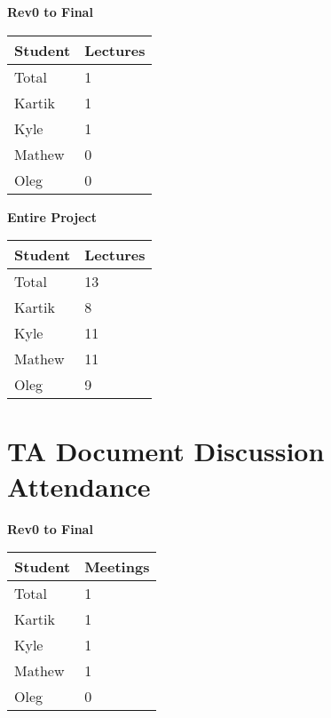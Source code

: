 \documentclass{article}
\begin{document}



\begin{table}[H]
    \centering
    \textbf{Rev0 to Final}\\
    \begin{tabular}{ll}
    \toprule
    \textbf{Student} & \textbf{Lectures}\\
    \midrule
    Total & 1\\
    Kartik & 1\\
    Kyle   & 1\\
    Mathew & 0\\
    Oleg   & 0\\
    \bottomrule
    \end{tabular}
    \end{table}


\begin{table}[H]
\centering
\textbf{Entire Project}\\
\begin{tabular}{ll}
\toprule
\textbf{Student} & \textbf{Lectures}\\
\midrule
Total & 13\\
Kartik & 8\\
Kyle   & 11\\
Mathew & 11\\
Oleg   & 9\\
\bottomrule
\end{tabular}
\end{table}


\section{TA Document Discussion Attendance}


\begin{table}[H]
    \centering
    \textbf{Rev0 to Final}\\
    \begin{tabular}{ll}
    \toprule
    \textbf{Student} & \textbf{Meetings}\\
    \midrule
    Total & 1\\
    Kartik & 1\\
    Kyle   & 1\\
    Mathew & 1\\
    Oleg   & 0\\
    \bottomrule
    \end{tabular}
    \end{table}
\end{document}
